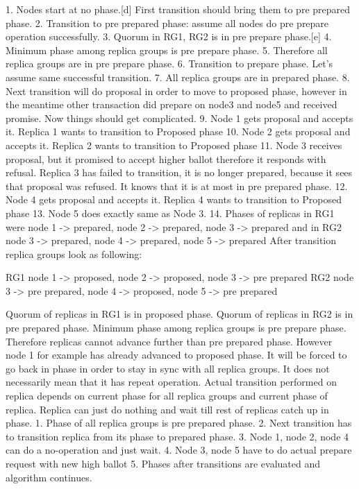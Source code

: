 1. Nodes start at no phase.[d] First transition should bring them to pre prepared phase.
2. Transition to pre prepared phase: assume all nodes do pre prepare operation successfully.
3. Quorum in RG1, RG2 is in pre prepare phase.[e]
4. Minimum phase among replica groups is pre prepare phase.
5. Therefore all replica groups are in pre prepare phase.
6. Transition to prepare phase. Let’s assume same successful transition.
7. All replica groups are in prepared phase.
8. Next transition will do proposal in order to move to proposed phase, however in the meantime other transaction did prepare on node3 and node5 and received promise. Now things should get complicated. 
9. Node 1 gets proposal and accepts it. Replica 1 wants to transition to Proposed phase
10. Node 2 gets proposal and accepts it. Replica 2 wants to transition to Proposed phase
11. Node 3 receives proposal, but it promised to accept higher ballot therefore it responds with refusal. Replica 3 has failed to transition, it is no longer prepared, because it sees that proposal was refused. It knows that it is at most in pre prepared phase. 
12. Node 4 gets proposal and accepts it. Replica 4 wants to transition to Proposed phase
13. Node 5 does exactly same as Node 3.
14. Phases of replicas in RG1 were { node 1 -> prepared, node 2 -> prepared, node 3 -> prepared } and in RG2 { node 3 -> prepared, node 4 -> prepared, node 5 -> prepared }
        After transition replica groups look as following:


RG1 { node 1 -> proposed, node 2 -> proposed, node 3 -> pre prepared }
RG2 { node 3 -> pre prepared, node 4 -> proposed, node 5 -> pre prepared }


Quorum of replicas in RG1 is in proposed phase.
Quorum of replicas in RG2 is in pre prepared phase.
Minimum phase among replica groups is pre prepare phase.
        Therefore replicas cannot advance further than pre prepared phase. However node 1 for example has already advanced to proposed phase. It will be forced to go back in phase in order to stay in sync with all replica groups. It does not necessarily mean that it has repeat operation. Actual transition performed on replica depends on current phase for all replica groups and current phase of replica. Replica can just do nothing and wait till rest of replicas catch up in phase.
1. Phase of all replica groups is pre prepared phase.
2. Next transition has to transition replica from its phase to prepared phase.
3. Node 1, node 2, node 4 can do a no-operation and just wait.
4. Node 3, node 5 have to do actual prepare request with new high ballot
5. Phases after transitions are evaluated and algorithm continues.
        
